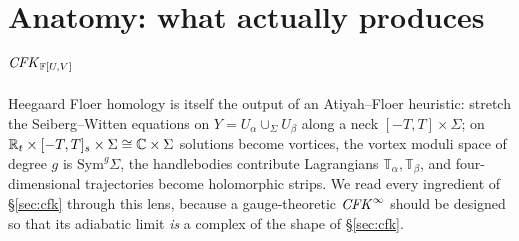 \section{Anatomy: what actually produces $\mathit{CFK}_{\mathbb{F}[U,V]}$}\label{sec:mech}

Heegaard Floer homology is itself the output of an Atiyah--Floer heuristic: stretch the
Seiberg--Witten equations on $Y=U_\alpha\cup_\Sigma U_\beta$ along a neck $[-T,T]\times\Sigma$; on
$\mathbb{R}_t\times[-T,T]_s\times\Sigma\cong \mathbb{C}\times\Sigma$ solutions become vortices, the vortex moduli space of
degree $g$ is $\mathrm{Sym}^g\Sigma$, the handlebodies contribute Lagrangians $\mathbb T_\alpha,\mathbb T_\beta$, and
four-dimensional trajectories become holomorphic strips.  We read every ingredient of
\S\ref{sec:cfk} through this lens, because a gauge-theoretic $\mathit{CFK}^\infty$ should be designed so that
its adiabatic limit \emph{is} a complex of the shape of \S\ref{sec:cfk}.

